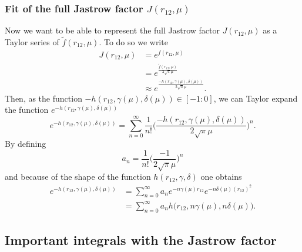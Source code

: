 \documentclass[aip,jcp,reprint,noshowkeys,superscriptaddress]{revtex4-1}
\begin{document}
\subsubsection{Fit of the full Jastrow factor $J(r_{12},\mu)$}
Now we want to be able to represent the full Jastrow factor $J(r_{12},\mu)$ as a Taylor series of $\tilde{f}(r_{12},\mu)$. 
To do so we write
\begin{equation}
 \begin{aligned}
 \label{def_fit_j}
 J(r_{12},\mu) & = e^{f(r_{12},\mu)} \\
               & = e^{\frac{\tilde{f}(r_{12},\mu)}{2\sqrt{\pi}\mu}} \\
               & \approx e^{\frac{-h(r_{12},\gamma(\mu),\delta(\mu))}{2\sqrt{\pi}\mu}}. 
 \end{aligned}
\end{equation}
Then, as the function $-h(r_{12},\gamma(\mu),\delta(\mu)) \in [-1:0]$, we can Taylor expand the function $e^{-h(r_{12},\gamma(\mu),\delta(\mu))}$
\begin{equation}
 e^{-h(r_{12},\gamma(\mu),\delta(\mu))} = \sum_{n=0}^{\infty} \frac{1}{n!}\bigg(\frac{-h(r_{12},\gamma(\mu),\delta(\mu))}{2\sqrt{\pi}\mu}\bigg)^n. 
\end{equation}
By defining 
\begin{equation}
 a_n = \frac{1}{n!}\bigg(\frac{-1}{2\sqrt{\pi}\mu}\bigg)^n
\end{equation}
and because of the shape of the function $h(r_{12},\gamma,\delta)$ one obtains 
\begin{equation}
 \begin{aligned}
 \label{h_r_dl}
 e^{-h(r_{12},\gamma(\mu),\delta(\mu))} & = \sum_{n=0}^{\infty} a_n e^{-n\gamma(\mu)r_{12}} e^{-n\delta(\mu)(r_{12})^2} \\
                                      & = \sum_{n=0}^{\infty} a_n h\bigg( r_{12}, n\gamma(\mu),n\delta(\mu)\bigg).
 \end{aligned}
\end{equation}

\subsection{Important integrals with the Jastrow factor}
\end{document}
